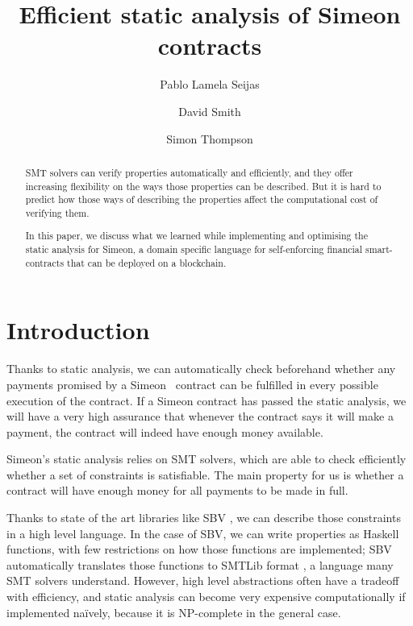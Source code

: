 \documentclass[english,runningheads]{llncs}
\begin{document}
\title{Efficient static analysis of Simeon contracts}

\author{Pablo {Lamela Seijas} \and
        David Smith \and
        Simon Thompson}



\maketitle
\begin{abstract}
SMT solvers can verify properties automatically and efficiently, and they offer increasing
flexibility on the ways those properties can be described. But it is hard to predict how those ways of describing the properties affect the computational cost of verifying them.

In this paper, we discuss what we learned while implementing and optimising the static analysis for Simeon, a domain specific language for self-enforcing financial smart-contracts that can be deployed on a blockchain.
\end{abstract}
\section{Introduction\label{sec:Introduction}}

Thanks to static analysis, we can automatically check beforehand whether any
payments promised by a Simeon~\cite{simeon2020,Simeon:2018} contract can be fulfilled in every
possible execution of the contract. If a Simeon contract has passed
the static analysis, we will have a very high assurance
that whenever the contract says it will make a payment, the contract will
indeed have enough money available.

Simeon's static analysis relies on SMT solvers, which are able to check efficiently
whether a set of constraints is satisfiable. The main property for us is whether a contract will have enough money for all payments to be made in full.

Thanks to state of the art
libraries like SBV \cite{erkok2019sbv}, we can describe those constraints in a
high level language. In the case of SBV, we can write properties as
Haskell functions, with few restrictions on how those functions are
implemented; SBV automatically translates those functions to SMTLib format \cite{barrett2010smt}, a language many SMT solvers understand.
However, high level abstractions often have a tradeoff with efficiency, and static analysis can become very expensive computationally if
implemented naïvely, because it is NP-complete in the general case.
 
\end{document}
